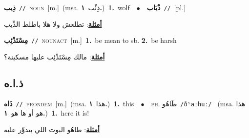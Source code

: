 \documentclass[10pt,a4paper,twoside]{article} %
\begin{document}
\begin{multicols}{2}
{\setlength\topsep{0pt}\textbf{\foreignlanguage{arabic}{ذِيب}}\ {\color{gray}\texttt{//}\color{black}}\ \textsc{noun}\ [m.]\ \color{gray}(msa. \foreignlanguage{arabic}{ذِئْب}~\foreignlanguage{arabic}{\textbf{١.}})\color{black}\ \textbf{1.}~wolf\ \ $\bullet$\ \ \setlength\topsep{0pt}\textbf{\foreignlanguage{arabic}{ذْيَاب}}\ {\color{gray}\texttt{//}\color{black}}\ [pl.]\  \begin{flushright}\color{gray}\foreignlanguage{arabic}{\textbf{\underline{\foreignlanguage{arabic}{أمثلة}}}: تطلعش ولا هلا باطلط الذِّيب}\end{flushright}\color{black}} \vspace{2mm}

{\setlength\topsep{0pt}\textbf{\foreignlanguage{arabic}{مِسْتَذْئِب}}\ {\color{gray}\texttt{//}\color{black}}\ \textsc{noun\textunderscore act}\ [m.]\ \textbf{1.}~be mean to sb.  \textbf{2.}~be harsh\  \begin{flushright}\color{gray}\foreignlanguage{arabic}{\textbf{\underline{\foreignlanguage{arabic}{أمثلة}}}: مالك مِسْتَذْئِب عليها مسكينة؟}\end{flushright}\color{black}} \vspace{2mm}

\vspace{-3mm}
\subsection*{\color{blue}\foreignlanguage{arabic}{ذ.ا.ه}\color{blue}{ (ntws)}} 

{\setlength\topsep{0pt}\textbf{\foreignlanguage{arabic}{ذَاه}}\ {\color{gray}\texttt{//}\color{black}}\ \textsc{pron\textunderscore dem}\ [m.]\ \color{gray}(msa. \foreignlanguage{arabic}{هذا}~\foreignlanguage{arabic}{\textbf{١.}})\color{black}\ \textbf{1.}~this\ \ $\bullet$\ \ \textsc{ph.} \color{gray} \foreignlanguage{arabic}{ظَاهُو}\color{black}\ {\color{gray}\texttt{/{\sffamily ðˤaːhuː}/}\color{black}}\ \color{gray} (msa. \foreignlanguage{arabic}{هذا هو أو ها هو}~\foreignlanguage{arabic}{\textbf{١.}})\color{black}\ \textbf{1.}~here it is!\  \begin{flushright}\color{gray}\foreignlanguage{arabic}{\textbf{\underline{\foreignlanguage{arabic}{أمثلة}}}: ظاهُو البوت اللي بتدوِّر عليه}\end{flushright}\color{black}} \vspace{2mm}


\end{multicols}
\end{document}
